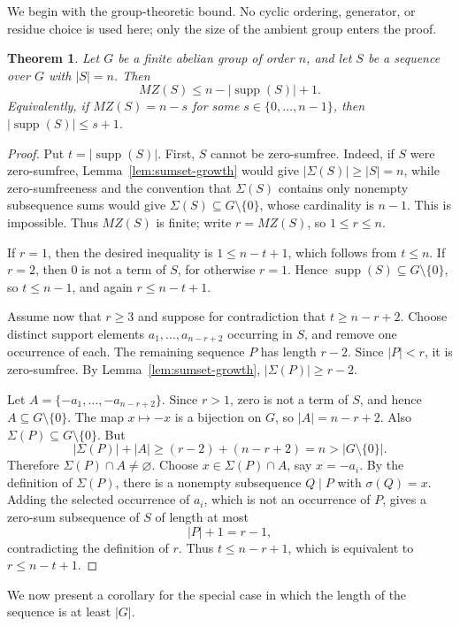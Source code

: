 \documentclass[12pt,reqno]{amsart}
\newtheorem{theorem}{Theorem}[section]
\theoremstyle{definition}
\theoremstyle{remark}
\DeclareMathOperator{\supp}{supp}
\begin{document}
We begin with the group-theoretic bound.  No cyclic ordering, generator, or residue choice is used here; only the size of the ambient group enters the proof.

\begin{theorem}\label{thm:finite-abelian-main}
Let $G$ be a finite abelian group of order $n$, and let $S$ be a sequence over $G$ with $|S|=n$.  Then
\[
  MZ(S)\le n-|\supp(S)|+1.
\]
Equivalently, if $MZ(S)=n-s$ for some $s\in\{0,\ldots,n-1\}$, then $|\supp(S)|\le s+1$.
\end{theorem}

\begin{proof}
Put $t=|\supp(S)|$.  First, $S$ cannot be zero-sumfree.  Indeed, if $S$ were zero-sumfree, Lemma~\ref{lem:sumset-growth} would give $|\Sigma(S)|\ge |S|=n$, while zero-sumfreeness and the convention that $\Sigma(S)$ contains only nonempty subsequence sums would give $\Sigma(S)\subseteq G\setminus\{0\}$, whose cardinality is $n-1$.  This is impossible.  Thus $MZ(S)$ is finite; write $r=MZ(S)$, so $1\le r\le n$.

If $r=1$, then the desired inequality is $1\le n-t+1$, which follows from $t\le n$.  If $r=2$, then $0$ is not a term of $S$, for otherwise $r=1$.  Hence $\supp(S)\subseteq G\setminus\{0\}$, so $t\le n-1$, and again $r\le n-t+1$.

Assume now that $r\ge 3$ and suppose for contradiction that $t\ge n-r+2$.  Choose distinct support elements $a_1,\ldots,a_{n-r+2}$ occurring in $S$, and remove one occurrence of each.  The remaining sequence $P$ has length $r-2$.  Since $|P|<r$, it is zero-sumfree.  By Lemma~\ref{lem:sumset-growth}, $|\Sigma(P)|\ge r-2$.

Let $A=\{-a_1,\ldots,-a_{n-r+2}\}$.  Since $r>1$, zero is not a term of $S$, and hence $A\subseteq G\setminus\{0\}$.  The map $x\mapsto -x$ is a bijection on $G$, so $|A|=n-r+2$.  Also $\Sigma(P)\subseteq G\setminus\{0\}$.  But
\[
 |\Sigma(P)|+|A|\ge (r-2)+(n-r+2)=n>|G\setminus\{0\}|.
\]
Therefore $\Sigma(P)\cap A\ne \varnothing$.  Choose $x\in\Sigma(P)\cap A$, say $x=-a_i$.  By the definition of $\Sigma(P)$, there is a nonempty subsequence $Q\mid P$ with $\sigma(Q)=x$.  Adding the selected occurrence of $a_i$, which is not an occurrence of $P$, gives a zero-sum subsequence of $S$ of length at most
\[
  |P|+1=r-1,
\]
contradicting the definition of $r$.  Thus $t\le n-r+1$, which is equivalent to $r\le n-t+1$.
\end{proof}

We now present a corollary for the special case in which the length of the sequence is at least $|G|$.
\end{document}
